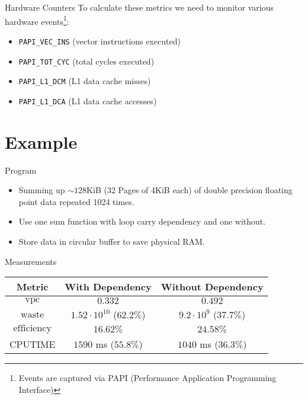\documentclass[aspectratio=169,xcolor=dvipsnames]{beamer}
\begin{document}
\begin{frame}{Hardware Counters}
    To calculate these metrics we need to monitor various hardware events\footnote{Events are captured via PAPI (Performance Application Programming Interface)}:
    \begin{itemize}
        \item \texttt{PAPI_VEC_INS} (vector instructions executed)
        \item \texttt{PAPI_TOT_CYC} (total cycles executed)
        \item \texttt{PAPI_L1_DCM} (L1 data cache misses)
        \item \texttt{PAPI_L1_DCA} (L1 data cache accesses)
    \end{itemize}
\end{frame}

\section{Example}

\begin{frame}{Program}
    \begin{itemize}
        \item Summing up $\sim128$KiB (32 Pages of 4KiB each) of double precision floating point data repeated 1024 times.
        \item Use one sum function with loop carry dependency and one without.
        \item Store data in circular buffer to save physical RAM.
    \end{itemize}
\end{frame}

\begin{frame}{Measurements}
    \begin{table}
        \centering
        \begin{tabular}{|c|c|c|}
            \hline
            Metric              & With Dependency & Without Dependency\\\hline
            $\text{vpc}$        & $0.332$ & $0.492$ \\
            $\text{waste}$      & $1.52 \cdot 10^{10}$ ($62.2\%$) & $9.2 \cdot 10^9$ ($37.7\%$) \\
            $\text{efficiency}$ & $16.62\%$ & $24.58\%$ \\
            CPUTIME             & $1590$ ms ($55.8\%$) & $1040$ ms ($36.3\%$) \\\hline
        \end{tabular}
    \end{table}
\end{frame}
\end{document}
